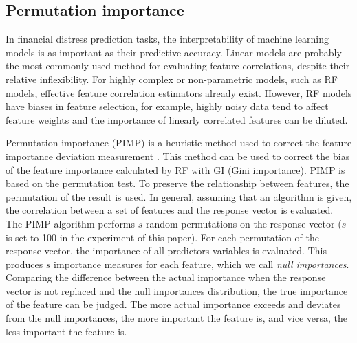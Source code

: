 \documentclass[review]{elsarticle}
\begin{document}
\subsection{Permutation importance}
In financial distress prediction tasks, the interpretability of machine learning models is as important as their predictive accuracy. Linear models are probably the most commonly used method for evaluating feature correlations, despite their relative inflexibility. For highly complex or non-parametric models, such as RF models, effective feature correlation estimators already exist. However, RF models have biases in feature selection, for example, highly noisy data tend to affect feature weights and the importance of linearly correlated features can be diluted.

Permutation importance (PIMP) is a heuristic method used to correct the feature importance deviation measurement \citep{Altmann2010}. This method can be used to correct the bias of the feature importance calculated by RF with GI (Gini importance). PIMP is based on the permutation test. To preserve the relationship between features, the permutation of the result is used. In general, assuming that an algorithm is given, the correlation between a set of features and the response vector is evaluated. The PIMP algorithm performs $s$ random permutations on the response vector ($s$ is set to 100 in the experiment of this paper). For each permutation of the response vector, the importance of all predictors variables is evaluated. This produces $s$ importance measures for each feature, which we call \textit{null importances}. Comparing the difference between the actual importance when the response vector is not replaced and the null importances distribution, the true importance of the feature can be judged. The more actual importance exceeds and deviates from the null importances, the more important the feature is, and vice versa, the less important the feature is.
\end{document}
